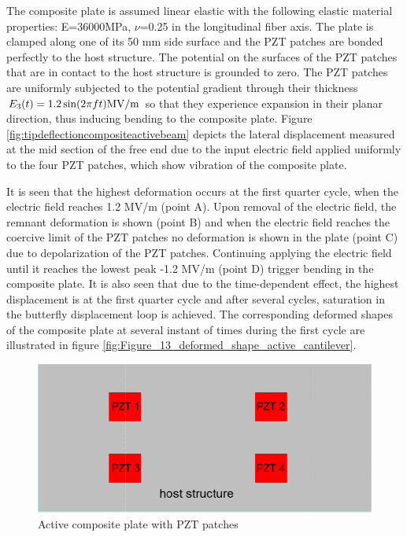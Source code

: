 The composite plate is assumed linear elastic with the following elastic material properties: E=36000MPa, $\nu$=0.25 in the longitudinal fiber axis. 
The plate is clamped along one of its 50 mm side surface and the PZT patches are bonded perfectly to the host structure. 
The potential on the surfaces of the PZT patches that are in contact to the host structure is grounded to zero. 
The PZT patches are uniformly subjected to the potential gradient through their thickness ${E_3}(t) = 1.2\sin (2\pi ft){\rm{ MV/m}}$ so that they experience expansion in their planar direction, thus inducing bending to the composite plate. 
Figure \ref{fig:tipdeflectioncompositeactivebeam} depicts the lateral displacement measured at the mid section of the free end due to the input electric field applied uniformly to the four PZT patches, which show vibration of the composite plate. 

It is seen that the highest deformation occurs at the first quarter cycle, when the electric field reaches 1.2 MV/m (point A).  
Upon removal of the electric field, the remnant deformation is shown (point B) and when the electric field reaches the coercive limit of the PZT patches no deformation is shown in the plate (point C) due to depolarization of the PZT patches. 
Continuing applying the electric field until it reaches the lowest peak -1.2 MV/m (point D) trigger bending in the composite plate. 
It is also seen that due to the time-dependent effect, the highest displacement is at the first quarter cycle and after several cycles, saturation in the butterfly displacement loop is achieved. 
The corresponding deformed shapes of the composite plate at several instant of times during the first cycle are illustrated in figure \ref{fig:Figure_13_deformed_shape_active_cantilever}. 

\begin{figure}
\centering
\includegraphics[width=6.0in]{./chap_2_pol_sw/figures/activecompositeplatewithpatches.pdf}
\caption{Active composite plate with PZT patches}
\label{fig:ActiveComposBeam} 
\end{figure}

